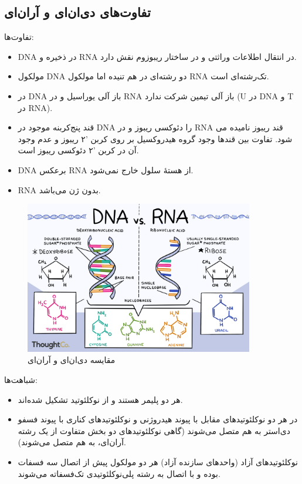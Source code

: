 \documentclass[12pt,a4paper,BCOR=.7cm,headsepline,bibliography=totoc]{report}
\begin{document}
\subsection{تفاوت‌های دی‌ان‌ای و آران‌ای}

تفاوت‌ها:
\begin{itemize}
\item DNA در ذخیره و RNA در انتقال اطلاعات وراثتی و در ساختار ریبوزوم نقش دارد.
\item مولکول DNA دو رشته‌ای در هم تنیده اما مولکول RNA تک‌رشته‌ای است.
\item 
در DNA باز آلی یوراسیل و در RNA باز آلی تیمین شرکت ندارد (U در DNA و T در RNA).
\item
قند پنج‌کربنه موجود در DNA را دئوکسی ریبوز و در RNA قند ریبوز نامیده می شود. تفاوت بین قندها وجود گروه هیدروکسیل بر روی کربن '۲ ریبوز و عدم وجود آن در کربن '۲ دئوکسی ریبوز است.
\item DNA برعکس RNA از هستهٔ سلول خارج نمی‌شود.
\item RNA بدون ژن می‌باشد.

\end{itemize}
{\begin{figure}
\centering
\includegraphics[width=10cm, ]{pictures/dnarna.png}
\caption{
مقایسه دی‌ان‌ای و آران‌ای
}\label{wrap-fig:3}
\end{figure}

شباهت‌ها:
\begin{itemize}
\item هر دو پلیمر هستند و از نوکلئوتید تشکیل شده‌اند.
\item در هر دو نوکلئوتیدهای مقابل با پیوند هیدروژنی و نوکلئوتیدهای کناری با پیوند فسفو دی‌استر به هم متصل می‌شوند (گاهی نوکلئوتیدهای دو بخش متفاوت از یک رشته آران‌ای، به هم متصل می‌شوند).
\item نوکلئوتیدهای آزاد (واحدهای سازنده آزاد) هر دو مولکول پیش از اتصال سه فسفات بوده و با اتصال به رشته پلی‌نوکلئوتیدی تک‌فسفاته می‌شوند.

\end{itemize}}
\end{document}
